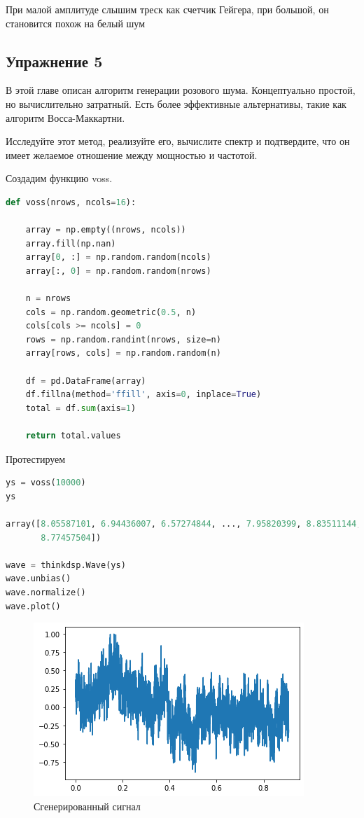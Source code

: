 При малой амплитуде слышим треск как счетчик Гейгера, при большой, он становится похож на белый шум


\subsection{Упражнение 5}

В этой главе описан алгоритм генерации розового шума. Концептуально простой, но вычислительно затратный. Есть более эффективные альтернативы, такие как алгоритм Восса-Маккартни.

\noindent Исследуйте этот метод, реализуйте его, вычислите спектр и подтвердите, что он имеет желаемое отношение между мощностью и частотой.

Создадим функцию voss.

\begin{lstlisting}[language=Python]
def voss(nrows, ncols=16):

    array = np.empty((nrows, ncols))
    array.fill(np.nan)
    array[0, :] = np.random.random(ncols)
    array[:, 0] = np.random.random(nrows)
    
    n = nrows
    cols = np.random.geometric(0.5, n)
    cols[cols >= ncols] = 0
    rows = np.random.randint(nrows, size=n)
    array[rows, cols] = np.random.random(n)

    df = pd.DataFrame(array)
    df.fillna(method='ffill', axis=0, inplace=True)
    total = df.sum(axis=1)

    return total.values
\end{lstlisting}

Протестируем

\begin{lstlisting}[language=Python]
ys = voss(10000)
ys

array([8.05587101, 6.94436007, 6.57274844, ..., 7.95820399, 8.83511144,
       8.77457504])
       
wave = thinkdsp.Wave(ys)
wave.unbias()
wave.normalize()
wave.plot()
\end{lstlisting}

\begin{figure}[H]
	\begin{center}
		\includegraphics[scale=1]{fig/lab04/lab04_12.png}
		\caption{Сгенерированный сигнал}
	\end{center}
\end{figure}

